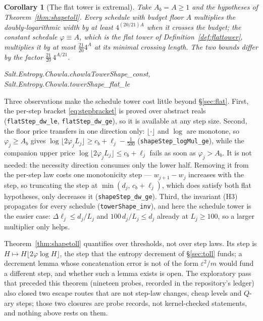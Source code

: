 \documentclass[11pt]{amsart}
\newcommand{\leanname}[1]{\par{\noindent\small\ttfamily\raggedright #1\par}}
\newcommand{\leaninline}[1]{{\small\texttt{#1}}}
\newtheorem{corollary}[theorem]{Corollary}
\theoremstyle{remark}
\begin{document}
\begin{corollary}[The flat tower is extremal]\label{cor:extremal}
Take $A_b = A \ge 1$ and the hypotheses of Theorem~\ref{thm:shapetoll}.
Every schedule with budget floor $A$ multiplies the doubly-logarithmic
width by at least $4^{(20/21)A}$ when it crosses the budget; the constant
schedule $\varphi \equiv A$, which is the flat tower of
Definition~\ref{def:flattower}, multiplies it by at most
$\frac{21}{20}4^{A}$ at its minimal crossing length. The two bounds differ
by the factor $\frac{21}{20}\,4^{A/21}$.
\leanname{Salt.Entropy.Chowla.chowlaTowerShape\_const,
Salt.Entropy.Chowla.towerShape\_flat\_le}
\end{corollary}

Three observations make the schedule tower cost little beyond
\S\ref{sec:flat}. First, the per-step bracket \eqref{eq:stepbracket} is
proved over abstract reals (\leaninline{flatStep\_dw\_le},
\leaninline{flatStep\_dw\_ge}), so it is available at any step size.
Second, the floor price transfers in one direction only: $\lfloor\cdot\rfloor$
and $\log$ are monotone, so $\varphi_j \ge A_b$ gives
$\log\lfloor 2\varphi_j L_j\rfloor \ge c_b + \ell_j - \frac{1}{500}$
(\leaninline{shapeStep\_logMul\_ge}), while the companion upper price
$\log\lfloor 2\varphi_j L_j\rfloor \le c_b + \ell_j$ fails as soon as
$\varphi_j > A_b$. It is not needed: the necessity direction consumes only
the lower half. Removing it from the per-step law costs one monotonicity
step --- $w_{j+1} - w_j$ increases with the step, so truncating the step at
$\min(d_j,\, c_b + \ell_j)$, which does satisfy both flat hypotheses,
only decreases it (\leaninline{shapeStep\_dw\_ge}). Third, the invariant
(H3) propagates for every schedule (\leaninline{towerShape\_inv}), and here
the schedule tower is the easier case: $\Delta\ell_j \le d_j/L_j$ and
$100\,d_j/L_j \le d_j$ already at $L_j \ge 100$, so a larger multiplier
only helps.

Theorem~\ref{thm:shapetoll} quantifies over thresholds, not over step laws.
Its step is $H \mapsto H\lfloor 2\varphi\log H\rfloor$, the step that the
entropy decrement of \S\ref{sec:toll} funds; a decrement lemma whose
concatenation error is not of the form $\varepsilon^{2}/m$ would fund a
different step, and whether such a lemma exists is open. The exploratory
pass that preceded this theorem (nineteen probes, recorded in the
repository's ledger) also closed two escape routes that are not step-law
changes, cheap levels and $Q$-ary steps; those two closures are probe
records, not kernel-checked statements, and nothing above rests on them.
\end{document}
